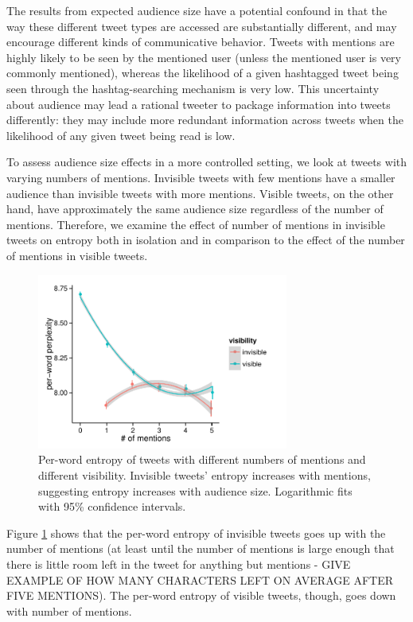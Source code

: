 \documentclass[11pt,letterpaper]{article}
\begin{document}
The results from expected audience size have a potential confound in that the way these different tweet types are accessed are substantially different, and may encourage different kinds of communicative behavior.  Tweets with mentions are highly likely to be seen by the mentioned user (unless the mentioned user is very commonly mentioned), whereas the likelihood of a given hashtagged tweet being seen through the hashtag-searching mechanism is very low.  This uncertainty about audience may lead a rational tweeter to package information into tweets differently: they may include more redundant information across tweets when the likelihood of any given tweet being read is low.

To assess audience size effects in a more controlled setting, we look at tweets with varying numbers of mentions.  Invisible tweets with few mentions have a smaller audience than invisible tweets with more mentions.  Visible tweets, on the other hand, have approximately the same audience size regardless of the number of mentions.  Therefore, we examine the effect of number of mentions in invisible tweets on entropy both in isolation and in comparison to the effect of the number of mentions in visible tweets.

\begin{figure}[t]
 \centering
  \includegraphics[width=3.25in]{figures/cmcl-mentions-pw.pdf}
 \caption{Per-word entropy of tweets with different numbers of mentions and different visibility.  Invisible tweets' entropy increases with mentions, suggesting entropy increases with audience size.  Logarithmic fits with 95\% confidence intervals.}\label{fig:mentions}\vspace*{-.5em}
\end{figure}

Figure \ref{fig:mentions} shows that the per-word entropy of invisible tweets goes up with the number of mentions (at least until the number of mentions is large enough that there is little room left in the tweet for anything but mentions - GIVE EXAMPLE OF HOW MANY CHARACTERS LEFT ON AVERAGE AFTER FIVE MENTIONS).  The per-word entropy of visible tweets, though, goes down with number of mentions.  
\end{document}
